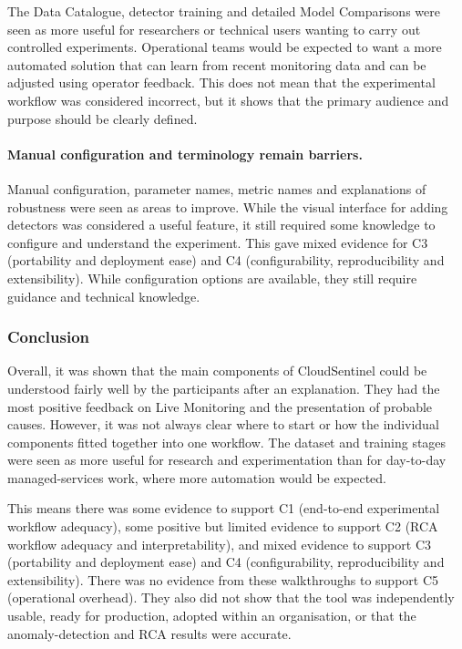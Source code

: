 The Data Catalogue, detector training and detailed Model Comparisons were seen as more useful for researchers or technical users wanting to carry out controlled experiments. Operational teams would be expected to want a more automated solution that can learn from recent monitoring data and can be adjusted using operator feedback. This does not mean that the experimental workflow was considered incorrect, but it shows that the primary audience and purpose should be clearly defined.

\paragraph{Manual configuration and terminology remain barriers.}

Manual configuration, parameter names, metric names and explanations of robustness were seen as areas to improve. While the visual interface for adding detectors was considered a useful feature, it still required some knowledge to configure and understand the experiment. This gave mixed evidence for C3 (portability and deployment ease) and C4 (configurability, reproducibility and extensibility). While configuration options are available, they still require guidance and technical knowledge.

\subsubsection{Conclusion}

Overall, it was shown that the main components of CloudSentinel could be understood fairly well by the participants after an explanation. They had the most positive feedback on Live Monitoring and the presentation of probable causes. However, it was not always clear where to start or how the individual components fitted together into one workflow. The dataset and training stages were seen as more useful for research and experimentation than for day-to-day managed-services work, where more automation would be expected.

This means there was some evidence to support C1 (end-to-end experimental workflow adequacy), some positive but limited evidence to support C2 (RCA workflow adequacy and interpretability), and mixed evidence to support C3 (portability and deployment ease) and C4 (configurability, reproducibility and extensibility). There was no evidence from these walkthroughs to support C5 (operational overhead). They also did not show that the tool was independently usable, ready for production, adopted within an organisation, or that the anomaly-detection and RCA results were accurate.

